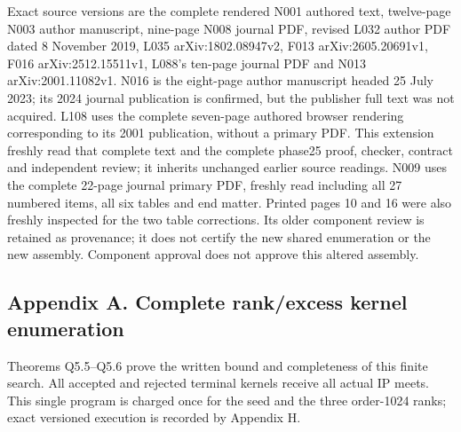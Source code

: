 \documentclass[
  10pt,
  letterpaper,
]{article}
\begin{document}
Exact source versions are the complete rendered N001 authored text,
twelve-page N003 author manuscript, nine-page N008 journal PDF, revised
L032 author PDF dated 8 November 2019, L035 arXiv:1802.08947v2, F013
arXiv:2605.20691v1, F016 arXiv:2512.15511v1, L088's ten-page journal PDF
and N013 arXiv:2001.11082v1. N016 is the eight-page author manuscript
headed 25 July 2023; its 2024 journal publication is confirmed, but the
publisher full text was not acquired. L108 uses the complete seven-page
authored browser rendering corresponding to its 2001 publication,
without a primary PDF. This extension freshly read that complete text
and the complete phase25 proof, checker, contract and independent
review; it inherits unchanged earlier source readings. N009 uses the
complete 22-page journal primary PDF, freshly read including all 27
numbered items, all six tables and end matter. Printed pages 10 and 16
were also freshly inspected for the two table corrections. Its older
component review is retained as provenance; it does not certify the new
shared enumeration or the new assembly. Component approval does not
approve this altered assembly.

\subsection{Appendix A. Complete rank/excess kernel
enumeration}\label{appendix-a.-complete-rankexcess-kernel-enumeration}

Theorems Q5.5--Q5.6 prove the written bound and completeness of this
finite search. All accepted and rejected terminal kernels receive all
actual IP meets. This single program is charged once for the seed and
the three order-1024 ranks; exact versioned execution is recorded by
Appendix H.
\end{document}
